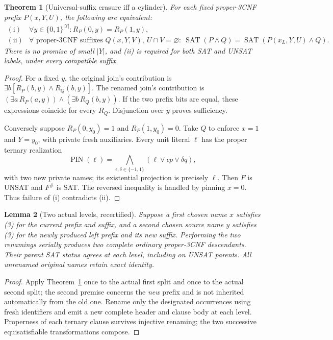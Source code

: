 \documentclass[11pt]{article}
\newtheorem{theorem}{Theorem}
\newtheorem{lemma}[theorem]{Lemma}
\newcommand{\SAT}{\operatorname{SAT}}
\begin{document}
\begin{theorem}[Universal-suffix erasure iff a cylinder]\label{th:cyl}
For each fixed proper-3CNF prefix \(P(x,Y,U)\), the following are equivalent:
\[
\begin{array}{ll}
\mathrm{(i)} & \forall y\in\{0,1\}^{|Y|}:
       R_P(0,y)=R_P(1,y),\\
\mathrm{(ii)} & \forall\text{ proper-3CNF suffixes }Q(x,Y,V),
  \ U\cap V=\varnothing:
  \ \SAT(P\wedge Q)=\SAT(P(x_L,Y,U)\wedge Q).
\end{array} \tag{3}
\]
There is no promise of small \(|Y|\), and (ii) is required for \emph{both}
SAT and UNSAT labels, under every compatible suffix.
\end{theorem}
\begin{proof}
For a fixed \(y\), the original join's contribution is
\(\exists b[R_P(b,y)\wedge R_Q(b,y)]\).
The renamed join's contribution is
\((\exists a\,R_P(a,y))\wedge(\exists b\,R_Q(b,y))\).
If the two prefix bits are equal, these expressions coincide for every
\(R_Q\). Disjunction over \(y\) proves sufficiency.

Conversely suppose \(R_P(0,y_0)=1\) and \(R_P(1,y_0)=0\).
Take \(Q\) to enforce \(x=1\) and \(Y=y_0\), with private fresh
auxiliaries. Every unit literal \(\ell\) has the proper ternary realization
\[
 \operatorname{PIN}(\ell)=
 \bigwedge_{\epsilon,\delta\in\{-1,1\}}
 (\ell\vee\epsilon p\vee\delta q),
\]
with two new private names; its existential projection is precisely \(\ell\).
Then \(F\) is UNSAT and \(F^\#\) is SAT. The reversed inequality is handled
by pinning \(x=0\). Thus failure of (i) contradicts (ii).
\end{proof}

\begin{lemma}[Two actual levels, recertified]\label{lem:depth}
Suppose a first chosen name \(x\) satisfies (3) for the current prefix
and suffix, and a second chosen source name \(y\) satisfies (3) for the
\emph{newly produced} left prefix and its new suffix. Performing the two
renamings serially produces two complete ordinary proper-3CNF descendants.
Their parent SAT status agrees at each level, including on UNSAT parents.
All unrenamed original names retain exact identity.
\end{lemma}
\begin{proof}
Apply Theorem~\ref{th:cyl} once to the actual first split and once to
the actual second split; the second premise concerns the \emph{new}
prefix and is not inherited automatically from the old one.
Rename only the designated occurrences using fresh identifiers and
emit a new complete header and clause body at each level. Properness
of each ternary clause survives injective renaming; the two successive
equisatisfiable transformations compose.
\end{proof}
\end{document}
